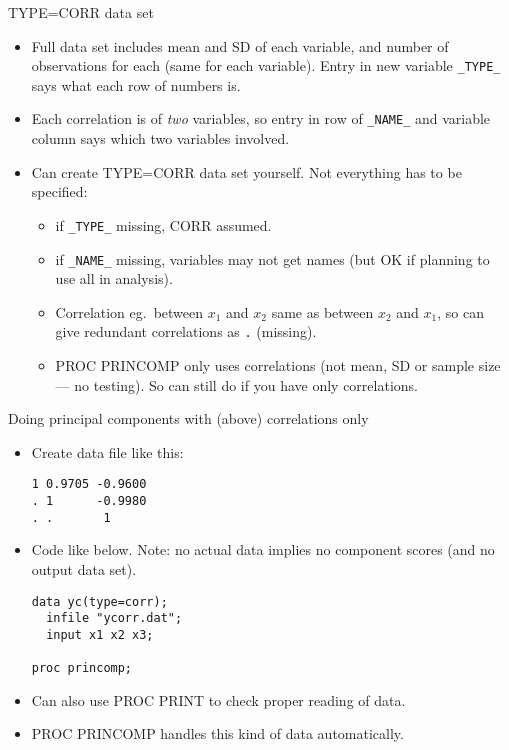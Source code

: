 \documentclass[pdf]{prosper}
\begin{document}
\begin{slide}{TYPE=CORR data set}

  \begin{itemize}
  \item Full data set includes mean and SD of each variable, and number of observations for each (same for each variable). Entry in new variable \verb-_TYPE_- says what each row of numbers is.
  \item Each correlation is of {\em two} variables, so entry in row of \verb-_NAME_- and variable column says which two variables involved.
  \item Can create TYPE=CORR data set yourself. Not everything has to be specified:
    \begin{itemize}
    \item if \verb-_TYPE_- missing, CORR assumed.
    \item if \verb-_NAME_- missing, variables may not get names (but OK if planning to use all in analysis).
    \item Correlation eg.\ between $x_1$ and $x_2$ same as between $x_2$ and $x_1$, so can give redundant correlations as \verb-.- (missing).
    \item PROC PRINCOMP only uses correlations (not mean, SD or sample size --- no testing). So can still do if you have only correlations.
    \end{itemize}
  \end{itemize}
  
\end{slide}

\begin{slide}{Doing principal components with (above) correlations only}

  \begin{itemize}
  \item Create data file like this:

\begin{verbatim}
1 0.9705 -0.9600
. 1      -0.9980
. .       1
\end{verbatim}

  \item Code like below. Note: no actual data implies no component scores (and no output data set).

\begin{verbatim}
data yc(type=corr);
  infile "ycorr.dat";
  input x1 x2 x3;

proc princomp;

\end{verbatim}

  \item Can also use PROC PRINT to check proper reading of data.

  \item PROC PRINCOMP handles this kind of data automatically.
  \end{itemize}
  
\end{slide}
\end{document}
